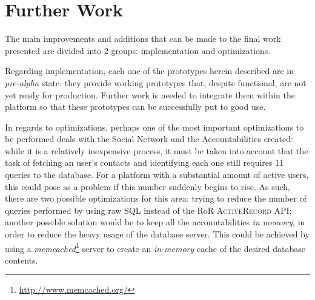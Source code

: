 \section{Further Work}\label{sec:further_work}

The main improvements and additions that can be made to the final work presented are divided into 2 groups: implementation and optimizations.

Regarding implementation, each one of the prototypes herein described are in \textit{pre-alpha} state: they provide working prototypes that, despite functional, are not yet ready for production. Further work is needed to integrate them within the platform so that these prototypes can be successfully put to good use.

In regards to optimizations, perhaps one of the most important optimizations to be performed deals with the Social Network and the Accountabilities created: while it is a relatively inexpensive process, it must be taken into account that the task of fetching an user's contacts and identifying each one still requires 11 queries to the database. For a platform with a substantial amount of active users, this could pose as a problem if this number suddenly begins to rise. As such, there are two possible optimizations for this area: trying to reduce the number of queries performed by using raw SQL instead of the RoR \textsc{ActiveRecord} API; another possible solution would be to keep all the accountabilities \emph{in memory}, in order to reduce the heavy usage of the database server. This could be achieved by using a \emph{memcached}\footnote{\url{http://www.memcached.org/}} server to create an \emph{in-memory} cache of the desired database contents.

